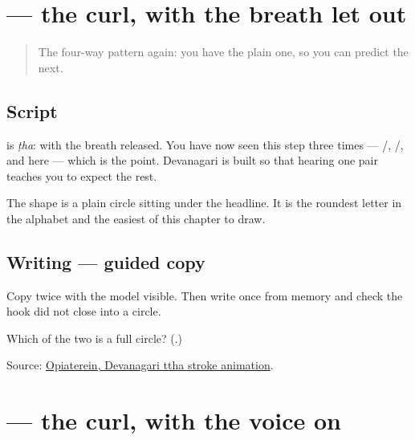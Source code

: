 \section[\texorpdfstring{\mr{ठ} (ṭha)}{ठ (ṭha)}]{ — the curl, with the breath let out}

\label{lesson:MR-W07-ttha}



\begin{quote}
The four-way pattern again: you have the plain one, so you can predict the next.
\end{quote}

\subsection*{Script}
\begin{quote}
\end{quote}

\textbf{} is \emph{ṭha}: \textbf{} with the breath released. You have now seen this step three times — \textbf{}/\textbf{}, \textbf{}/\textbf{}, and here — which is the point. Devanagari is built so that hearing one pair teaches you to expect the rest.

The shape is a plain circle sitting under the headline. It is the roundest letter in the alphabet and the easiest of this chapter to draw.

\subsection*{Writing — guided copy}

Copy \textbf{} twice with the model visible. Then write \textbf{} once from memory and check the hook did not close into a circle.

\begin{tcolorbox}[breakable,colback=teal!4,colframe=teal!35!black,title={Before you move on}]
Which of the two is a full circle? (\textbf{}.)

Source: \href{https://commons.wikimedia.org/wiki/File:Deva-\%E0\%A4\%A0-order.gif}{Opiaterein, Devanagari ttha stroke animation}.
\end{tcolorbox}
\section[\texorpdfstring{\mr{ड} (ḍa)}{ड (ḍa)}]{ — the curl, with the voice on}

